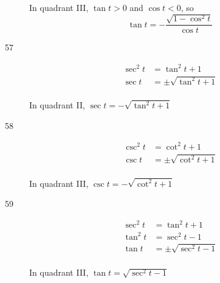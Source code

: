 \documentclass{exam}
\begin{document}
\begin{description}

        In quadrant III, $\tan t > 0$ and $\cos t < 0$, so 
        \[
          \tan t = \boxed{ - \frac{\sqrt{ 1 - \cos^2 t }}{\cos t} }
        \]

      \pagebreak

      \item[57] 
        \begin{align*}
          \sec^2 t & = \tan^2 t + 1 \\
          \sec t   & = \pm \sqrt{\tan^2 t + 1} \\
        \end{align*}

        In quadrant II, $\sec t = \boxed{ - \sqrt{\tan^2 t + 1} }$ 

      \item[58] 
        \begin{align*}
          \csc^2 t & = \cot^2 t + 1 \\
          \csc t   & = \pm \sqrt{\cot^2 t + 1} \\
        \end{align*}

        In quadrant III, $\csc t = \boxed{ - \sqrt{\cot^2 t + 1} }$ 

      \item[59] 
        \begin{align*}
          \sec^2 t & = \tan^2 t + 1 \\
          \tan^2 t & = \sec^2 t - 1 \\
          \tan t   & = \pm \sqrt{ \sec^2 t - 1 } \\
        \end{align*}

        In quadrant III, $\tan t = \boxed{\sqrt{ \sec^2 t - 1 }}$ 

      \pagebreak


\end{description}
\end{document}
